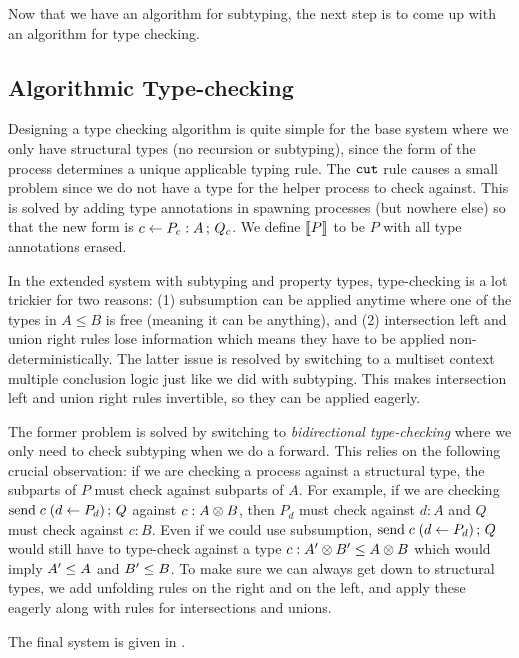\documentclass[a4paper,USenglish]{lipics-v2016}
\begin{document}
Now that we have an algorithm for subtyping, the next step is to come up with an algorithm for type checking.


\subsection{Algorithmic Type-checking}

Designing a type checking algorithm is quite simple for the base system where we only have structural types (no recursion or subtyping), since the form of the process determines a unique applicable typing rule. The $\texttt{cut}$ rule causes a small problem since we do not have a type for the helper process to check against. This is solved by adding type annotations in spawning processes (but nowhere else) so that the new form is $c \leftarrow P_c : A \,;\, Q_c$. We define $\left \llbracket {P} \right \rrbracket$ to be $P$ with all type annotations erased.

In the extended system with subtyping and property types, type-checking is a lot trickier for two reasons: (1) subsumption can be applied anytime where one of the types in $A \le B$ is free (meaning it can be anything), and (2) intersection left and union right rules lose information which means they have to be applied non-deterministically. The latter issue is resolved by switching to a multiset context multiple conclusion logic just like we did with subtyping. This makes intersection left and union right rules invertible, so they can be applied eagerly.

The former problem is solved by switching to \emph{bidirectional type-checking} where we only need to check subtyping when we do a forward. This relies on the following crucial observation: if we are checking a process against a structural type, the subparts of $P$ must check against subparts of $A$. For example, if we are checking $\mathrm{send}\; c \; (d \leftarrow P_d) \,;\, Q$ against $c : A \otimes B$, then $P_d$ must check against $d : A$ and $Q$ must check against $c : B$. Even if we could use subsumption, $\mathrm{send}\; c \; (d \leftarrow P_d) \,;\, Q$ would still have to type-check against a type $c : A' \otimes B' \le A \otimes B$ which would imply $A' \le A$ and $B' \le B$.  To make sure we can always get down to structural types, we add unfolding rules on the right and on the left, and apply these eagerly along with rules for intersections and unions.


The final system is given in .
\end{document}
